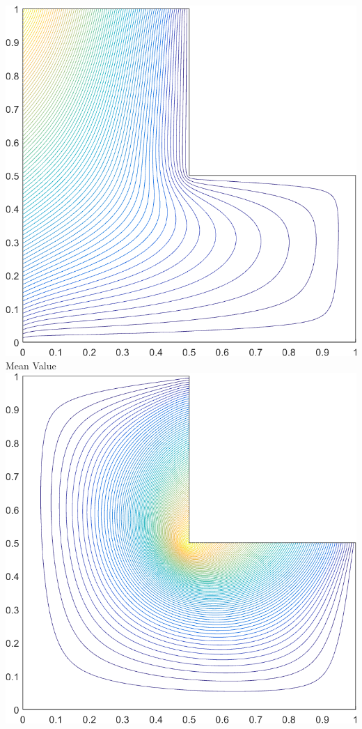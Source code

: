 \documentclass[compress,10pt]{beamer}
\begin{document}
\begin{frame}[t]
{\begin{columns}
{}\includegraphics[width=0.85\columnwidth]{images/L-domain_MV1_contour_b6.png}\\
Mean Value
\centering
{}\includegraphics[width=0.85\columnwidth]{images/L-domain_MAXENT1_contour_b4.png} \\
\vspace{3mm}

\end{columns}}
\end{frame}
\end{document}
